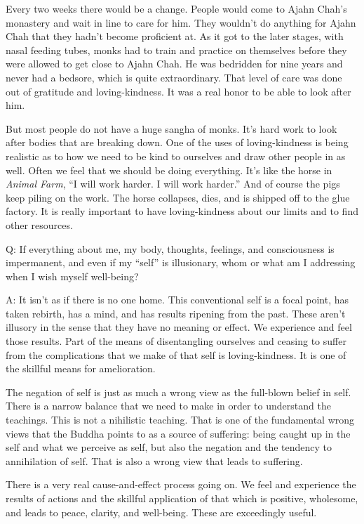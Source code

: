 Every two weeks there would be a change. People would come to Ajahn
Chah’s monastery and wait in line to care for him. They wouldn’t do
anything for Ajahn Chah that they hadn’t become proficient at. As it got
to the later stages, with nasal feeding tubes, monks had to train and
practice on themselves before they were allowed to get close to Ajahn
Chah. He was bedridden for nine years and never had a bedsore, which is
quite extraordinary. That level of care was done out of gratitude and
loving-kindness. It was a real honor to be able to look after him.

But most people do not have a huge sangha of monks. It’s hard work to
look after bodies that are breaking down. One of the uses of
loving-kindness is being realistic as to how we need to be kind to
ourselves and draw other people in as well. Often we feel that we should
be doing everything. It’s like the horse in \emph{Animal Farm}, “I will
work harder. I will work harder.” And of course the pigs keep piling on
the work. The horse collapses, dies, and is shipped off to the glue
factory. It is really important to have loving-kindness about our limits
and to find other resources.

\vspace{\the\qaskip}
Q: If everything about me, my body, thoughts, feelings, and
consciousness is impermanent, and even if my “self” is illusionary, whom
or what am I addressing when I wish myself well-being?

\vspace{\the\qaskip}
A: It isn’t as if there is no one home. This conventional self is a
focal point, has taken rebirth, has a mind, and has results ripening
from the past. These aren’t illusory in the sense that they have no
meaning or effect. We experience and feel those results. Part of the
means of disentangling ourselves and ceasing to suffer from the
complications that we make of that self is loving-kindness. It is one of
the skillful means for amelioration.

The negation of self is just as much a wrong view as the full-blown
belief in self. There is a narrow balance that we need to make in order
to understand the teachings. This is not a nihilistic teaching. That is
one of the fundamental wrong views that the Buddha points to as a source
of suffering: being caught up in the self and what we perceive as self,
but also the negation and the tendency to annihilation of self. That is
also a wrong view that leads to suffering.

There is a very real cause-and-effect process going on. We feel and
experience the results of actions and the skillful application of that
which is positive, wholesome, and leads to peace, clarity, and
well-being. These are exceedingly useful.

